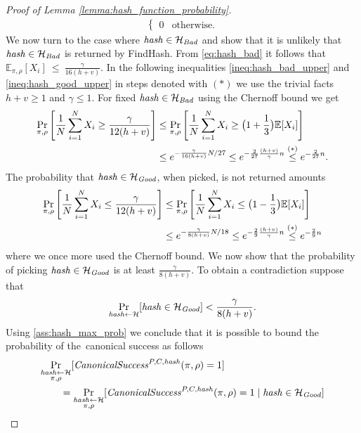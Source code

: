 \begin{proof}[Proof of Lemma \ref{lemma:hash_function_probability}]
\begin{align*}
\begin{cases}
    0 & \text{otherwise.}
  \end{cases}
\end{align*}
We now turn to the case where $\operatorname{\mathit{hash}} \in \mathcal{H}_{\operatorname{\mathit{Bad}}}$ and show that it is unlikely that $\operatorname{\mathit{hash}} \in \mathcal{H}_{\operatorname{\mathit{Bad}}}$
is returned by FindHash.
From \eqref{eq:hash_bad} it follows that $\mathbb{E}_{{\pi}, \rho}[X_i]~\leq~\frac{\gamma}{16(h+v)}$.
In the following inequalities \eqref{ineq:hash_bad_upper} and \eqref{ineq:hash_good_upper} in steps denoted
with $(*)$ we use the trivial facts $h + v \geq 1$ and $\gamma \leq 1$.
For fixed $\operatorname{\mathit{hash}} \in \mathcal{H}_{\operatorname{\mathit{Bad}}}$ using the Chernoff bound we get
\begin{align}
  \label{ineq:hash_bad_upper}
  \underset{\pi,\rho}{\Pr} \left[\frac{1}{N} \sum_{i=1}^{N} X_i \geq \frac{\gamma}{12(h+v)} \right]
  &\leq \underset{\pi, \rho}{\Pr}\left[\frac{1}{N} \sum_{i=1}^{N} X_i \geq \bigl(1 + \frac{1}{3}\bigr) \mathbb{E}[X_i]\right] \notag\\
  &\leq e^{-{\frac{\gamma}{16(h+v)}} N / 27} \leq e^{-\frac{2}{27}\frac{(h+v)}{\gamma}n} \stackrel{(*)}{\leq} e^{-\frac{2}{27}n}.
\end{align}
The probability that $\operatorname{\mathit{hash}} \in \mathcal{H}_{\operatorname{\mathit{Good}}}$, when picked, is not returned amounts
\begin{align}
  \label{ineq:hash_good_upper}
  \underset{\pi, \rho}{\Pr}\left[\frac{1}{N} \sum_{i=1}^{N} X_i \leq \frac{\gamma}{12(h+v)}\right]
  &\leq \underset{\pi, \rho}{\Pr}\left[\frac{1}{N} \sum_{i=1}^{N} X_i \leq \bigl(1 - \frac{1}{3}\bigr)\mathbb{E}[X_i]\right] \notag\\
  &\leq e^{-{\frac{\gamma}{8(h+v)}} N / 18} \leq e^{-\frac{2}{9} \frac{(h+v)}{\gamma}n} \stackrel{(*)}{\leq} e^{-\frac{2}{9}n}
\end{align}
where we once more used the Chernoff bound.
We now show that the probability of picking $\operatorname{\mathit{hash}} \in \mathcal{H}_{\mathit{Good}}$ is at least $\frac{\gamma}{8(h+v)}$.
To obtain a contradiction suppose that
\begin{align}
  \label{ass:hash_max_prob}
\underset{\operatorname{\mathit{hash}} \leftarrow \mathcal{H}}{\Pr}[\operatorname{\mathit{hash}} \in \mathcal{H}_{\mathit{Good}}] < \frac{\gamma}{8(h+v)}.
\end{align}
Using \eqref{ass:hash_max_prob} we conclude that it is possible to bound the probability of the~canonical success as follows
\begin{align*}
  &\underset{\substack{\hash \leftarrow \cH \\ \pi, \rho}}{\Pr}[\CanonicalSuccess^{P,C,\hash}(\pi, \rho) = 1] \\
  &\IndI = \underset{\substack{ \hash \leftarrow \cH \\ \pi, \rho}}{\Pr}[\CanonicalSuccess^{P,C,\hash}(\pi, \rho) = 1 \mid \hash \in \cH_{\mathit{Good}}]

\end{align*}
\end{proof}
